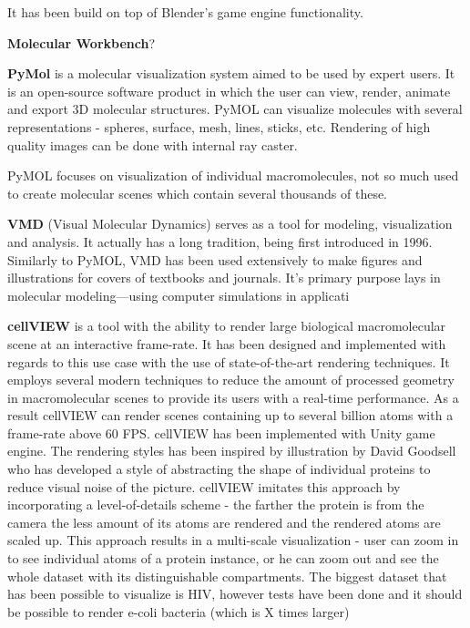 \documentclass[
  digital, %
  table,   %
  nolof,     %
  nolot,     %
]{fithesis3}
\begin{document}
It has been build on top of Blender's game engine functionality.

\textbf{Molecular Workbench}?

\textbf{PyMol}\cite{PyMOL} is a molecular visualization system aimed to be used by expert users. It is an open-source software product in which the user can view, render, animate and export 3D molecular structures. PyMOL can visualize molecules with several representations - spheres, surface, mesh, lines, sticks, etc. Rendering of high quality images can be done with internal ray caster.

PyMOL focuses on visualization of individual macromolecules, not so much used to create molecular scenes which contain several thousands of these.

\textbf{VMD} (Visual Molecular Dynamics)\cite{HUMP96} serves as a tool for modeling, visualization and analysis. It actually has a long tradition, being first introduced in 1996. Similarly to PyMOL, VMD has been used extensively to make figures and illustrations for covers of textbooks and journals. It's primary purpose lays in molecular modeling—using computer simulations in applicati

\textbf{cellVIEW}\cite{cellVIEW_2015} is a tool with the ability to render large biological macromolecular scene at an interactive frame-rate. It has been designed and implemented with regards to this use case with the use of state-of-the-art rendering techniques. It employs several modern techniques to reduce the amount of processed geometry in macromolecular scenes to provide its users with a real-time performance. As a result cellVIEW can render scenes containing up to several billion atoms with a frame-rate above 60 FPS. cellVIEW has been implemented with Unity game engine. The rendering styles has been inspired by illustration by David Goodsell who has developed a style of abstracting the shape of individual proteins to reduce visual noise of the picture. cellVIEW imitates this approach by incorporating a level-of-details scheme - the farther the protein is from the camera the less amount of its atoms are rendered and the rendered atoms are scaled up. This approach results in a multi-scale visualization - user can zoom in to see individual atoms of a protein instance, or he can zoom out and see the whole dataset with its distinguishable compartments. The biggest dataset that has been possible to visualize is HIV, however tests have been done and it should be possible to render e-coli bacteria (which is X times larger)
\end{document}

